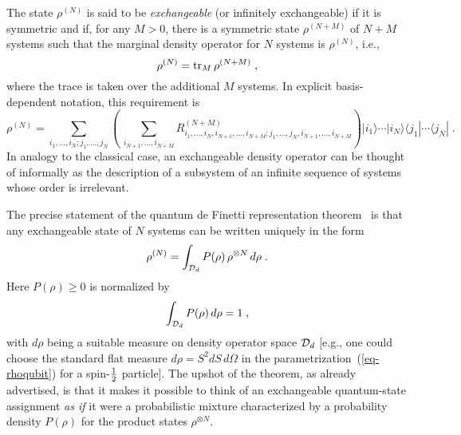The state $\rho^{(N)}$ is said to be {\it exchangeable\/} (or
infinitely exchangeable) if it is symmetric and if, for any $M>0$,
there is a symmetric state $\rho^{(N+M)}$ of $N+M$ systems such that
the marginal density operator for $N$ systems is $\rho^{(N)}$, i.e.,
\begin{equation}
\rho^{(N)} = {\rm tr}_M\,\rho^{(N+M)} \;,
\label{HoundDog}
\end{equation}
where the trace is taken over the additional $M$ systems.  In
explicit basis-dependent notation, this requirement is
\begin{equation}
\rho^{(N)}=
\!\!\sum_{i_1,\ldots,i_N;j_1,\ldots,j_N}
\!\!\left(\,\sum_{i_{N+1},\ldots,i_{N+M}}\!\!
R^{(N+M)}_{i_1,\ldots,i_N,i_{N+1},\ldots,i_{N+M};
j_1,\ldots,j_N,i_{N+1},\ldots,i_{N+M}}\right)\!
|i_1\rangle\cdots|i_N\rangle \langle j_1| \cdots\langle j_N|\;.
\end{equation}
In analogy to the classical case, an exchangeable density operator can
be thought of informally as the description of a subsystem of an
infinite sequence of systems whose order is irrelevant.

The precise statement of the quantum de Finetti representation
theorem~\cite{Hudson1976,Stormer1969} is that any exchangeable state
of $N$ systems can be written uniquely in the form
\begin{equation}
\rho^{(N)}=\int_{{\cal D}_d} P(\rho)\, \rho^{\otimes N}\, d\rho\;.
\label{eq-qdefinetti}
\end{equation}
Here $P(\rho)\ge0$ is normalized by
\begin{equation}
\int_{{\cal D}_d} P(\rho)\,d\rho=1\;,
\end{equation}
with $d\rho$ being a suitable measure on density operator space
${\cal D}_d$ [e.g., one could choose the standard flat measure
$d\rho=S^2dS\,d\Omega$ in the parametrization~(\ref{eq-rhoqubit})
for a spin-$1\over 2$ particle].  The upshot of the theorem, as
already advertised, is that it makes it possible to think of an
exchangeable quantum-state assignment {\it as if\/} it were a
probabilistic mixture characterized by a probability density
$P(\rho)$ for the product states $\rho^{\otimes N}$.


